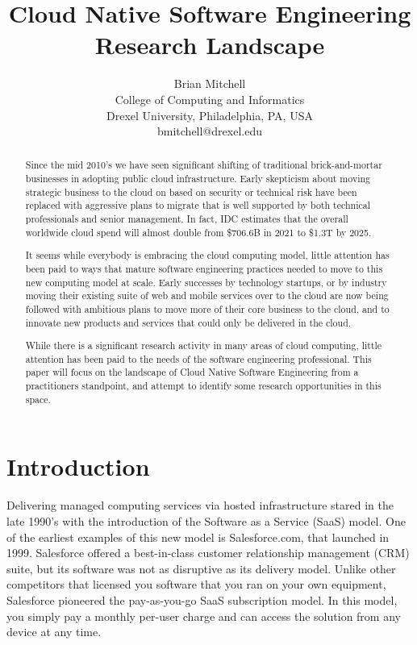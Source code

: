 \documentclass[conference]{IEEEconf}
\title{ 
        	Cloud Native Software Engineering Research Landscape
      }
\author{
			Brian Mitchell\\
			College of Computing and Informatics\\
			Drexel University, Philadelphia, PA, USA\\
			bmitchell@drexel.edu
}
\date{}
\begin{document}
%

\maketitle

\thispagestyle{empty}


\begin{abstract}
Since the mid 2010's we have seen significant shifting of traditional brick-and-mortar businesses in adopting public cloud infrastructure.  Early skepticism about moving strategic business to the cloud on based on security or technical risk have been replaced with aggressive plans to migrate that is well supported by both technical professionals and senior management. In fact, IDC estimates that the overall worldwide cloud spend will almost double from \$706.6B in 2021 to \$1.3T by 2025\cite{IDCReport}.  

It seems while everybody is embracing the cloud computing model, little attention has been paid to ways that mature software engineering practices needed to move to this new computing model at scale. Early successes by technology startups, or by industry moving their existing suite of web and mobile services over to the cloud are now being followed with ambitious plans to move more of their core business to the cloud, and to innovate new products and services that could only be delivered in the cloud.

While there is a significant research activity in many areas of cloud computing, little attention has been paid to the needs of the software engineering professional.  This paper will focus on the landscape of Cloud Native Software Engineering from a practitioners standpoint, and attempt to identify some research opportunities in this space.
\end{abstract}  

\section{Introduction}
\label{Intro}
Delivering managed computing services via hosted infrastructure stared in the late 1990's with the introduction of the Software as a Service (SaaS) model. One of the earliest examples of this new model is Salesforce.com, that launched in 1999\cite{SalesforceHistory}.  Salesforce offered a best-in-class customer relationship management (CRM) suite, but its software was not as disruptive as its delivery model. Unlike other competitors that licensed you software that you ran on your own equipment, Salesforce pioneered the pay-as-you-go SaaS subscription model. In this model, you simply pay a monthly per-user charge and can access the solution from any device at any time.     
\end{document}

